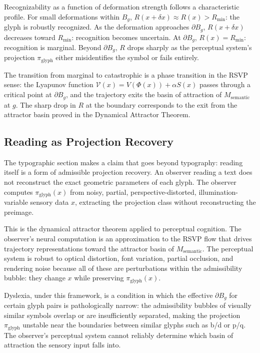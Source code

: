 \documentclass[12pt, a4paper]{article}
\theoremstyle{essaystyle}
\begin{document}
Recognizability as a function of deformation strength follows a characteristic
profile. For small deformations within $B_g$, $R(x+\delta x) \approx R(x) > R_{\min}$:
the glyph is robustly recognized. As the deformation approaches $\partial B_g$,
$R(x+\delta x)$ decreases toward $R_{\min}$: recognition becomes uncertain. At
$\partial B_g$, $R(x) = R_{\min}$: recognition is marginal. Beyond $\partial B_g$,
$R$ drops sharply as the perceptual system's projection $\pi_{\mathrm{glyph}}$ either
misidentifies the symbol or fails entirely.

The transition from marginal to catastrophic is a phase transition in the RSVP sense:
the Lyapunov function $\mathcal{V}(x) = V(\Phi(x)) + \alpha S(x)$ passes through a
critical point at $\partial B_g$, and the trajectory exits the basin of attraction of
$M_{\mathrm{semantic}}$ at $g$. The sharp drop in $R$ at the boundary corresponds
to the exit from the attractor basin proved in the Dynamical Attractor Theorem.

\subsection{Reading as Projection Recovery}

The typographic section makes a claim that goes beyond typography: reading itself is
a form of admissible projection recovery. An observer reading a text does not reconstruct
the exact geometric parameters of each glyph. The observer computes
$\pi_{\mathrm{glyph}}(x)$ from noisy, partial, perspective-distorted, illumination-variable
sensory data $x$, extracting the projection class without reconstructing the preimage.

This is the dynamical attractor theorem applied to perceptual cognition. The observer's
neural computation is an approximation to the RSVP flow that drives trajectory
representations toward the attractor basin of $M_{\mathrm{semantic}}$. The perceptual
system is robust to optical distortion, font variation, partial occlusion, and rendering
noise because all of these are perturbations within the admissibility bubble: they
change $x$ while preserving $\pi_{\mathrm{glyph}}(x)$.

Dyslexia, under this framework, is a condition in which the effective $\partial B_g$
for certain glyph pairs is pathologically narrow: the admissibility bubbles of visually
similar symbols overlap or are insufficiently separated, making the projection
$\pi_{\mathrm{glyph}}$ unstable near the boundaries between similar glyphs such as
b/d or p/q. The observer's perceptual system cannot reliably determine which basin of
attraction the sensory input falls into.
\end{document}
